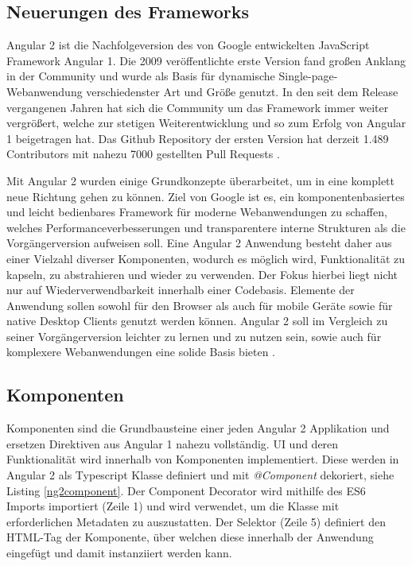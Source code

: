 \subsection{Neuerungen des Frameworks}

Angular 2 ist die Nachfolgeversion des von Google entwickelten JavaScript Framework Angular 1.
Die 2009 veröffentlichte erste Version fand großen Anklang in der Community
und wurde als Basis für dynamische Single-page-Webanwendung verschiedenster Art und Größe genutzt.
In den seit dem Release vergangenen Jahren hat sich die Community um das Framework immer weiter vergrößert,
welche zur stetigen Weiterentwicklung und so zum Erfolg von Angular 1 beigetragen hat.
Das Github Repository der ersten Version hat derzeit 1.489 Contributors mit nahezu 7000 gestellten Pull Requests \cite{ng1-github}.

Mit Angular 2 wurden einige Grundkonzepte überarbeitet, um in eine komplett neue Richtung gehen zu können.
Ziel von Google ist es, ein komponentenbasiertes und leicht bedienbares Framework für moderne
Webanwendungen zu schaffen, welches Performanceverbesserungen und transparentere interne Strukturen als die Vorgängerversion aufweisen soll.
Eine Angular 2 Anwendung besteht daher aus einer Vielzahl diverser Komponenten, wodurch es möglich wird,
Funktionalität zu kapseln, zu abstrahieren und wieder zu verwenden. Der Fokus hierbei liegt nicht nur auf Wiederverwendbarkeit innerhalb einer Codebasis.
Elemente der Anwendung sollen sowohl für den Browser als auch für mobile Geräte sowie für native Desktop Clients genutzt werden können.
Angular 2 soll im Vergleich zu seiner Vorgängerversion leichter zu lernen und zu nutzen sein,
sowie auch für komplexere Webanwendungen eine solide Basis bieten \cite[11-12]{Angular2}.


\subsection{Komponenten}

Komponenten sind die Grundbausteine einer jeden Angular 2 Applikation und ersetzen Direktiven aus Angular 1 nahezu vollständig.
UI und deren Funktionalität wird innerhalb von Komponenten implementiert.
Diese werden in Angular 2 als Typescript Klasse definiert und mit \emph{@Component} dekoriert, siehe Listing \ref{ng2component}.
Der Component Decorator wird mithilfe des ES6 Imports importiert (Zeile 1) und wird verwendet, um die Klasse mit erforderlichen Metadaten zu auszustatten.
Der Selektor (Zeile 5) definiert den HTML-Tag der Komponente, über welchen diese innerhalb der Anwendung eingefügt und damit instanziiert werden kann.

